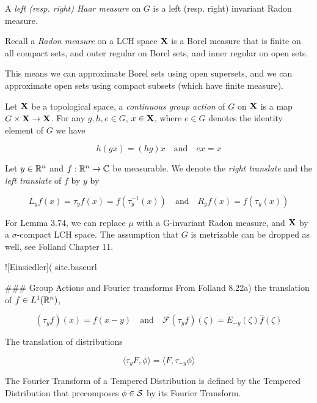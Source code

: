 \documentclass[../main-manifolds.tex]{subfiles}
\begin{document}
{A \emph{left (resp. right) Haar measure} on $G$ is a left (resp. right) invariant Radon measure.

\begin{remark}
Recall a \emph{Radon measure} on a LCH space ${\mathbf{X}}$ is a Borel measure that is finite on all compact sets, and outer regular on Borel sets, and inner regular on open sets. 

This means we can approximate Borel sets using open supersets, and we can approximate open sets using compact subsets (which have finite measure).
\end{remark}


Let ${\mathbf{X}}$ be a topological space, a \emph{continuous group action} of $G$ on ${\mathbf{X}}$ is a map $G\times {\mathbf{X}}\to {\mathbf{X}}$. For any $g,h,e\in G$, $x\in {\mathbf{X}}$, where $e\in G$ denotes the identity element of $G$ we have

$$h(gx) = (hg)x\quad\text{and}\quad ex = x$$


\begin{definition}
Let $y\in {\mathbb{R}^n}$ and $f: {\mathbb{R}^n}\to\mathbb{C}$ be measurable. We denote the \emph{right translate} and the \emph{left translate} of $f$ by $y$ by

$$
L_y f(x) = \tau_y f(x) = f(\tau_{y}^{-1}(x))\quad\text{and}\quad R_y f(x) = f(\tau_y(x))
$$

\end{definition}

For Lemma 3.74, we can replace $\mu$ with a G-invariant Radon measure, and ${\mathbf{X}}$ by a $\sigma$-compact LCH space. The assumption that $G$ is metrizable can be dropped as well, see Folland Chapter 11.

![Einsiedler]({{ site.baseurl }}{%

### Group Actions and Fourier transforms
From Folland 8.22a) the translation of $f\in L^1({\mathbb{R}^n})$,

$$
(\tau_y f)(x) = f(x-y)\quad\text{and}\quad \mathcal{F}(\tau_y f)(\zeta) = E_{-y}(\zeta)\hat{f}(\zeta)
$$

The translation of distributions

$$
\langle \tau_y F,\phi\rangle = \langle F, \tau_{-y}\phi\rangle
$$

The Fourier Transform of a Tempered Distribution is defined by the Tempered Distribution that precomposes $\phi\in \mathcal{S}$ by its Fourier Transform.

}}
\end{document}
